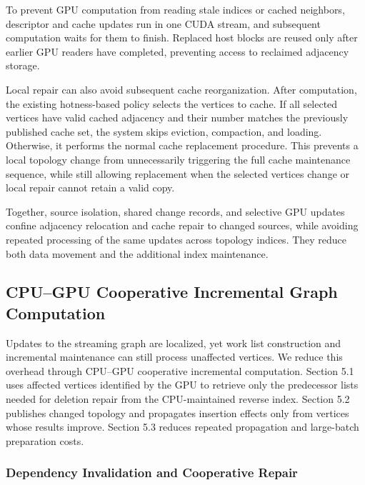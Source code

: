To prevent GPU computation from reading stale indices or cached neighbors, descriptor and cache updates run in one CUDA stream, and subsequent computation waits for them to finish. Replaced host blocks are reused only after earlier GPU readers have completed, preventing access to reclaimed adjacency storage.

Local repair can also avoid subsequent cache reorganization. After computation, the existing hotness-based policy selects the vertices to cache. If all selected vertices have valid cached adjacency and their number matches the previously published cache set, the system skips eviction, compaction, and loading. Otherwise, it performs the normal cache replacement procedure. This prevents a local topology change from unnecessarily triggering the full cache maintenance sequence, while still allowing replacement when the selected vertices change or local repair cannot retain a valid copy.

Together, source isolation, shared change records, and selective GPU updates confine adjacency relocation and cache repair to changed sources, while avoiding repeated processing of the same updates across topology indices. They reduce both data movement and the additional index maintenance.

\subsection{CPU--GPU Cooperative Incremental Graph Computation}
\label{sec:incremental-computation}


Updates to the streaming graph are localized, yet work list construction and incremental maintenance can still process unaffected vertices. We reduce this overhead through CPU--GPU cooperative incremental computation. Section 5.1 uses affected vertices identified by the GPU to retrieve only the predecessor lists needed for deletion repair from the CPU-maintained reverse index. Section 5.2 publishes changed topology and propagates insertion effects only from vertices whose results improve. Section 5.3 reduces repeated propagation and large-batch preparation costs.

\subsubsection{Dependency Invalidation and Cooperative Repair}
\label{sec:deletion-repair}


